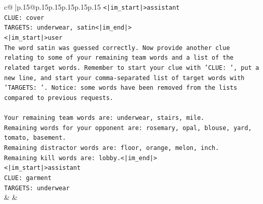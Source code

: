 \documentclass{article}
\begin{document}
{\begin{supertabular}{c@{$\;$}|p{.15\linewidth}@{}p{.15\linewidth}p{.15\linewidth}p{.15\linewidth}p{.15\linewidth}p{.15\linewidth}}
{{{\texttt{<|im\_start|>assistant} \\
\texttt{CLUE: cover} \\
\texttt{TARGETS: underwear, satin<|im\_end|>} \\
\texttt{<|im\_start|>user} \\
\texttt{The word satin was guessed correctly. Now provide another clue relating to some of your remaining team words and a list of the related target words. Remember to start your clue with 'CLUE: ', put a new line, and start your comma{-}separated list of target words with 'TARGETS: '. Notice: some words have been removed from the lists compared to previous requests.} \\
\\ 
\texttt{Your remaining team words are: underwear, stairs, mile.} \\
\texttt{Remaining words for your opponent are: rosemary, opal, blouse, yard, tomato, basement.} \\
\texttt{Remaining distractor words are: floor, orange, melon, inch.} \\
\texttt{Remaining kill words are: lobby.<|im\_end|>} \\
\texttt{<|im\_start|>assistant} \\
\texttt{CLUE: garment} \\
\texttt{TARGETS: underwear} \\
            }
        }
    }
    & & \\ \\


\end{supertabular}}
\end{document}
